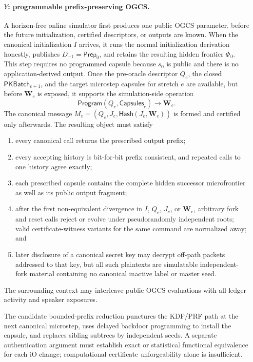 \paragraph{$Y$: programmable prefix-preserving OGCS.}
A horizon-free online simulator first produces one public OGCS parameter,
before the future initialization, certified descriptors, or outputs are
known.  When the canonical initialization $I$ arrives, it runs the normal
initialization derivation honestly, publishes $D_{-1}=\mathsf{Prep}_0$, and
retains the resulting hidden frontier $\Phi_0$.  This step requires no
programmed capsule because $s_0$ is public and there is no application-derived
output.  Once the
pre-oracle descriptor $Q_e$, the closed $\mathsf{PKBatch}_{e+1}$, and the
target microstep capsules for stretch $e$ are available, but before
$\mathbf W_e$ is exposed, it supports the simulation-side operation
\[
  \mathsf{Program}(Q_e,\mathsf{Capsules}_e)
      \longrightarrow\mathbf W_e.
\]
The canonical message
$M_e=(Q_e,J_e,\mathsf{Hash}(J_e,\mathbf W_e))$ is formed and certified only
afterwards.  The resulting object must satisfy
\begin{enumerate}
  \item every canonical call returns the prescribed output prefix;
  \item every accepting history is bit-for-bit prefix consistent, and
    repeated calls to one history agree exactly;
  \item each prescribed capsule contains the complete hidden successor
    microfrontier as well as its public output fragment;
  \item after the first non-equivalent divergence in $I$, $Q_e$, $J_e$, or
    $\mathbf W_e$, arbitrary fork and reset calls reject or evolve under
    pseudorandomly independent roots; valid certificate-witness variants for
    the same command are normalized away; and
  \item later disclosure of a canonical secret key may decrypt off-path
    packets addressed to that key, but all such plaintexts are simulatable
    independent-fork material containing no canonical inactive label or
    master seed.
\end{enumerate}
The surrounding context may interleave public OGCS evaluations with all
ledger activity and speaker exposures.

The candidate bounded-prefix reduction punctures the KDF/PRF path at the next
canonical microstep, uses delayed backdoor programming to install the capsule,
and replaces sibling subtrees by independent seeds.  A separate
authentication argument must establish exact or statistical functional
equivalence for each iO change; computational certificate unforgeability alone
is insufficient.

